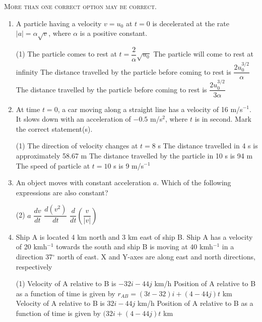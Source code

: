 \documentclass{article}
\renewcommand{\frac}[2]{\dfrac{#1}{#2}}
\begin{document}
\begin{center}
    \textsc{More than one correct option may be correct.}
\end{center}
\begin{enumerate}
    \item A particle having a velocity \( v = u_0 \) at \( t = 0 \) is decelerated at the rate \( |a| = \alpha \sqrt{v} \), where \( \alpha \) is a positive constant.
    \begin{tasks}(1)
        \task The particle comes to rest at \( t = \frac{2}{\alpha} \sqrt{u_0} \)
        \task The particle will come to rest at infinity
        \task The distance travelled by the particle before coming to rest is \( \frac{2u_0^{3/2}}{\alpha} \)
        \task The distance travelled by the particle before coming to rest is \( \frac{2u_0^{3/2}}{3\alpha} \)
    \end{tasks}

    \item At time \( t = 0 \), a car moving along a straight line has a velocity of 16 m/s\(^{-1}\). It slows down with an acceleration of \( -0.5 \) m/s\(^2\), where \( t \) is in second. Mark the correct statement(s).
    \begin{tasks}(1)
        \task The direction of velocity changes at \( t = 8 \) s
        \task The distance travelled in 4 s is approximately 58.67 m
        \task The distance travelled by the particle in 10 s is 94 m
        \task The speed of particle at \( t = 10 \) s is 9 m/s\(^{-1}\)
    \end{tasks}

    \item An object moves with constant acceleration \( a \). Which of the following expressions are also constant?
    \begin{tasks}(2)
        \task \( a \)
        \task \( \frac{dv}{dt} \)
        \task \( \frac{d(v^2)}{dt} \)
        \task \( \frac{d}{dt} \left( \frac{v}{|v|} \right) \)
    \end{tasks}

    \item Ship A is located 4 km north and 3 km east of ship B. Ship A has a velocity of 20 kmh\(^{-1}\) towards the south and ship B is moving at 40 kmh\(^{-1}\) in a direction 37\(^{\circ}\) north of east. X and Y-axes are along east and north directions, respectively
    \begin{tasks}(1)
        \task Velocity of A relative to B is \( -32i - 44j \) km/h
        \task Position of A relative to B as a function of time is given by \( r_{AB} = (3t - 32)i + (4 - 44j)t \) km
        \task Velocity of A relative to B is \( 32i - 44j \) km/h
        \task Position of A relative to B as a function of time is given by \( (32i + (4 - 44j)t \) km
    \end{tasks}


\end{enumerate}
\end{document}
